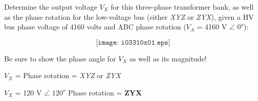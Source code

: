 

Determine the output voltage $V_{X}$ for this three-phase transformer bank, as well as the phase rotation for the low-voltage bus (either {\it XYZ} or {\it ZYX}), given a HV bus phase voltage of 4160 volts and ABC phase rotation ($V_A$ = 4160 V $\angle$ $0^o$):

$$\texttt{[image: i03310x01.eps]}$$

Be sure to show the phase angle for $V_X$ as well as its magnitude!

\vskip 10pt

$V_X$ = \underbar{\hskip 80pt}  \hskip 100pt Phase rotation = {\it XYZ} or {\it ZYX}







$V_X$ = 120 V $\angle$ $120^o$  \hskip 100pt Phase rotation = {\bf ZYX}










